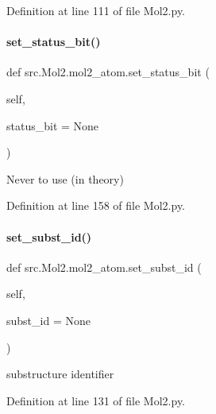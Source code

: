 Definition at line 111 of file Mol2.\+py.

\mbox{\label{classsrc_1_1Mol2_1_1mol2__atom_aff9e7682fa89d21231f89653f5032c17}} 
\paragraph{\texorpdfstring{set\+\_\+status\+\_\+bit()}{set\_status\_bit()}}
{\footnotesize\ttfamily def src.\+Mol2.\+mol2\+\_\+atom.\+set\+\_\+status\+\_\+bit (\begin{DoxyParamCaption}\item[{}]{self,  }\item[{}]{status\+\_\+bit = {\ttfamily None} }\end{DoxyParamCaption})}



Never to use (in theory) 



Definition at line 158 of file Mol2.\+py.

\mbox{\label{classsrc_1_1Mol2_1_1mol2__atom_ad594fb8ce376d0d52d9aca4ce221b92f}} 
\paragraph{\texorpdfstring{set\+\_\+subst\+\_\+id()}{set\_subst\_id()}}
{\footnotesize\ttfamily def src.\+Mol2.\+mol2\+\_\+atom.\+set\+\_\+subst\+\_\+id (\begin{DoxyParamCaption}\item[{}]{self,  }\item[{}]{subst\+\_\+id = {\ttfamily None} }\end{DoxyParamCaption})}



substructure identifier 



Definition at line 131 of file Mol2.\+py.

